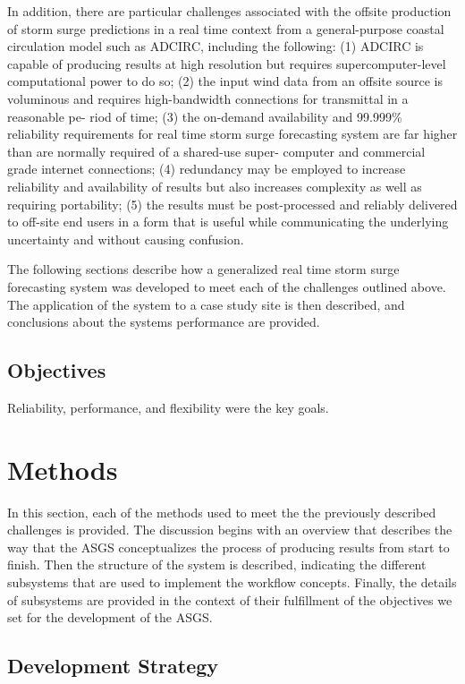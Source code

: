 \documentclass[12pt]{article}
\begin{document}
In addition, there are particular challenges associated with the 
offsite production of storm surge predictions in a real time context 
from a general-purpose coastal circulation model such as ADCIRC, 
including the following: (1) ADCIRC is capable of producing results 
at high resolution but requires supercomputer-level computational 
power to do so; (2) the input wind data from an offsite source is 
voluminous and requires high-bandwidth connections for transmittal 
in a reasonable pe- riod of time; (3) the on-demand availability and 
99.999\% reliability requirements for real time storm surge 
forecasting system are far higher than are normally required of a 
shared-use super- computer and commercial grade internet 
connections; (4) redundancy may be employed to increase reliability 
and availability of results but also increases complexity as well as 
requiring portability; (5) the results must be post-processed and 
reliably delivered to off-site end users in a form that is useful 
while communicating the underlying uncertainty and without causing 
confusion. 

The following sections describe how a generalized real time storm 
surge forecasting system was developed to meet each of the 
challenges outlined above. The application of the system to a case 
study site is then described, and conclusions about the systems 
performance are provided.

\subsection{Objectives}

Reliability, performance, and flexibility were the key goals. 

\section{Methods}

In this section, each of the methods used to meet the the previously 
described challenges is provided. The discussion begins with an 
overview that describes the way that the ASGS conceptualizes the 
process of producing results from start to finish. Then the 
structure of the system is described, indicating the different 
subsystems that are used to implement the workflow concepts. 
Finally, the details of subsystems are provided in the context of 
their fulfillment of the objectives we set for the development of 
the ASGS.  

\subsection{Development Strategy}
\end{document}
